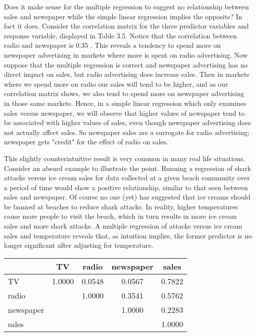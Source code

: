 \documentclass[10pt]{article}
\begin{document}
Does it make sense for the multiple regression to suggest no relationship between sales and newspaper while the simple linear regression implies the opposite? In fact it does. Consider the correlation matrix for the three predictor variables and response variable, displayed in Table 3.5. Notice that the correlation between radio and newspaper is 0.35 . This reveals a tendency to spend more on newspaper advertising in markets where more is spent on radio advertising. Now suppose that the multiple regression is correct and newspaper advertising has no direct impact on sales, but radio advertising does increase sales. Then in markets where we spend more on radio our sales will tend to be higher, and as our correlation matrix shows, we also tend to spend more on newspaper advertising in those same markets. Hence, in a simple linear regression which only examines sales versus newspaper, we will observe that higher values of newspaper tend to be associated with higher values of sales, even though newspaper advertising does not actually affect sales. So newspaper sales are a surrogate for radio advertising; newspaper gets "credit" for the effect of radio on sales.

This slightly counterintuitive result is very common in many real life situations. Consider an absurd example to illustrate the point. Running a regression of shark attacks versus ice cream sales for data collected at a given beach community over a period of time would show a positive relationship, similar to that seen between sales and newspaper. Of course no one (yet) has suggested that ice creams should be banned at beaches to reduce shark attacks. In reality, higher temperatures cause more people to visit the beach, which in turn results in more ice cream sales and more shark attacks. A multiple regression of attacks versus ice cream sales and temperature reveals that, as intuition implies, the former predictor is no longer significant after adjusting for temperature.


\begin{center}
\begin{tabular}{l|cccc}
 & TV & radio & newspaper & sales \\
\hline
TV & 1.0000 & 0.0548 & 0.0567 & 0.7822 \\
radio &  & 1.0000 & 0.3541 & 0.5762 \\
newspaper &  &  & 1.0000 & 0.2283 \\
sales &  &  &  & 1.0000 \\
\end{tabular}
\end{center}
\end{document}
